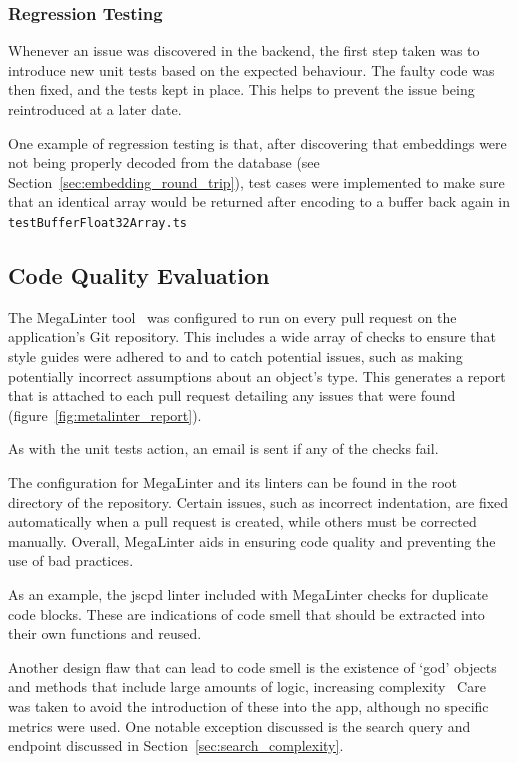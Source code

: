 \subsubsection{Regression Testing}

Whenever an issue was discovered in the backend, the first step taken was to
introduce new unit tests based on the expected behaviour. The faulty code was
then fixed, and the tests kept in place. This helps to prevent the issue being
reintroduced at a later date.

One example of regression testing is that, after discovering that embeddings were
not being properly decoded from the database (see Section~\ref{sec:embedding_round_trip}),
test cases were implemented to make sure that an identical array would be returned
after encoding to a buffer back again in \texttt{testBufferFloat32Array.ts}

\subsection{Code Quality Evaluation}
The MegaLinter tool~\cite{vuillamy_megalinter_nodate} was configured to run on every pull request on the application's Git repository. This includes a wide array
of checks to ensure that style guides were adhered to and to catch potential issues, such as making potentially incorrect
assumptions about an object's type. This generates a report that is attached to each pull request detailing
any issues that were found (figure~\ref{fig:metalinter_report}).

As with the unit tests action, an email is sent if any of the checks fail.

The configuration for MegaLinter and its linters can be found in the root directory of the repository.
Certain issues, such as incorrect indentation, are fixed automatically when a pull request is created, while others
must be corrected manually. Overall, MegaLinter aids in ensuring code quality and preventing the use of bad practices.

As an example, the jscpd linter included with MegaLinter checks for duplicate code blocks. These are indications of code
smell that should be extracted into their own functions and reused.~\cite{fowler_refactoring_1997}

Another design flaw that can lead to code smell is the existence of \enquote*{god} objects
and methods that include large amounts of logic, increasing complexity~\cite{marinescu_measurement_2005,vaucher_tracking_2009}
Care was taken to avoid the introduction of these into the \chef{} app, although no specific
metrics were used. One notable exception discussed is the search query and endpoint discussed in
Section~\ref{sec:search_complexity}.

